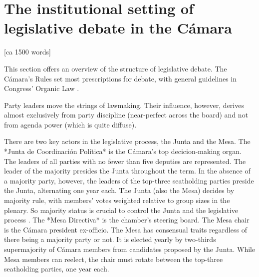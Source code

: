 \section{The institutional setting of legislative debate in the Cámara} [ca 1500 words]

This section offers an overview of the structure of legislative debate. The Cámara's Rules \citep{reglamentoDipMx.2019} set most prescriptions for debate, with general guidelines in Congress' Organic Law \citep{loceum.2019}.


Party leaders move the strings of lawmaking. Their influence, however, derives almost exclusively from party discipline (near-perfect across the board) and not from agenda power (which is quite diffuse). 

There are two key actors in the legislative process, the Junta and the Mesa. The *Junta de Coordinación Política* is the Cámara's top decicion-making organ. The leaders of all parties with no fewer than five deputies are represented. The leader of the majority presides the Junta throughout the term. In the absence of a majority party, however, the leaders of the top-three seatholding parties preside the Junta, alternating one year each. The Junta (also the Mesa) decides by majority rule, with members' votes weighted relative to group sizes in the plenary. So majority status is crucial to control the Junta and the legislative process \citep[cf.][]{cox.mccubbins.2005}. The *Mesa Directiva* is the chamber's steering board. The Mesa chair is the Cámara president ex-officio. The Mesa has consensual traits regardless of there being a majority party or not. It is elected yearly by two-thirds supermajority of Cámara members from candidates proposed by the Junta. While Mesa members can reelect, the chair must rotate between the top-three seatholding parties, one year each. 


